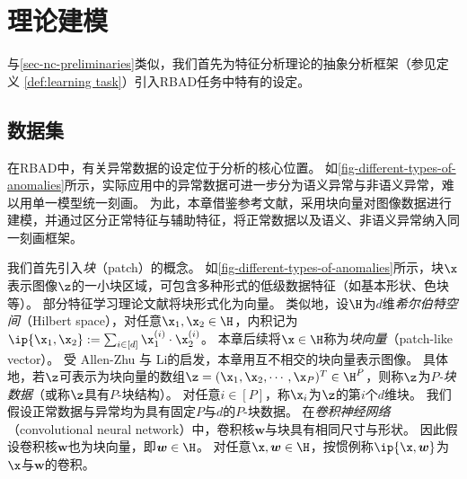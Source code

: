 \section{理论建模}\label{sec-problem-setup}

与\cref{sec-nc-preliminaries}类似，我们首先为特征分析理论的抽象分析框架（参见定义 \ref{def:learning task}）引入RBAD任务中特有的设定。

\subsection{数据集}\label{sec-data-assumption}

在RBAD中，有关异常数据的设定位于分析的核心位置。
如\cref{fig-different-types-of-anomalies}所示，实际应用中的异常数据可进一步分为语义异常与非语义异常，难以用单一模型统一刻画。
为此，本章借鉴参考文献\cite{DBLP:conf/iclr/Allen-ZhuL23}，采用块向量对图像数据进行建模，并通过区分正常特征与辅助特征，将正常数据以及语义、非语义异常纳入同一刻画框架。

我们首先引入\emph{块}（patch）的概念。
如\cref{fig-different-types-of-anomalies}所示，块$\x$表示图像$\z$的一小块区域，可包含多种形式的低级数据特征（如基本形状、色块等）。
部分特征学习理论文献\cite{DBLP:conf/iclr/Allen-ZhuL23,DBLP:journals/corr/abs-2303-04145}将块形式化为向量。
类似地，设$\H$为$d$维\emph{希尔伯特空间}（Hilbert space），对任意$\x_1, \x_2 \in \H$，内积记为$\ip{\x_1,\x_2} := \sum_{i \in [d]} \x_1^{(i)} \cdot \x_2^{(i)}$。
本章后续将$\x \in \H$称为\emph{块向量}（patch-like vector）。
受 Allen-Zhu 与 Li\cite{DBLP:conf/iclr/Allen-ZhuL23}的启发，本章用互不相交的块向量表示图像。
具体地，若$\z$可表示为块向量的数组$\z = (\x_1, \x_2, \cdots ,\x_P)^T \in \H^P$，则称$\z$为\emph{$P$-块数据}（或称$\z$具有{$P$-块结构}）。
对任意$ i \in [P]$，称$\x_i$为$\z$的第$i$个$d$维{块}。
我们假设正常数据与异常均为具有固定$P$与$d$的$P$-块数据。
在\emph{卷积神经网络}（convolutional neural network）中，卷积核$\boldsymbol{w}$与块具有相同尺寸与形状。
因此假设卷积核$\boldsymbol{w}$也为块向量，即$\boldsymbol{w} \in \H$。
对任意$\x, \boldsymbol{w} \in \H$，按惯例称$\ip{\x,\boldsymbol{w}}$为$\x$与$\boldsymbol{w}$的{卷积}。

